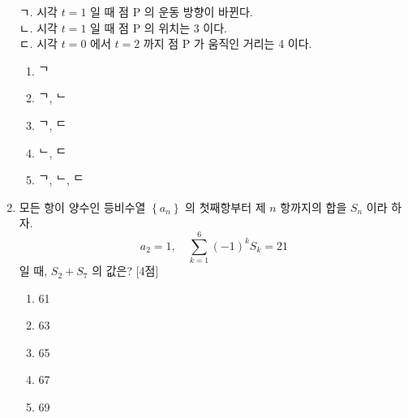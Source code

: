 \documentclass[10.5pt]{article}
\begin{document}
\begin{multicols}{2}
\begin{enumerate}
\begin{minipage}[t]{\linewidth}
\begin{tcolorbox}[colback=white, colframe=black, boxrule=0.5pt, arc=2pt, boxsep=3pt, left=4pt, right=4pt, top=3pt, bottom=3pt]
ㄱ. 시각 $t=1$ 일 때 점 P 의 운동 방향이 바뀐다.\\
ㄴ. 시각 $t=1$ 일 때 점 P 의 위치는 3 이다.\\
ㄷ. 시각 $t=0$ 에서 $t=2$ 까지 점 P 가 움직인 거리는 4 이다.
\end{tcolorbox}
\vspace{0.5em}
\begin{enumerate}[label={\textcircled{\arabic*}}, itemsep=0.2em, topsep=0.2em, leftmargin=*, align=left]
\item ᄀ
\item ᄀ, ᄂ
\item ᄀ, ᄃ
\item ᄂ, ᄃ
\item ᄀ, ᄂ, ᄃ
\end{enumerate}
\par\vspace{12\baselineskip}
\end{minipage}
\item \leavevmode\begin{minipage}[t]{\linewidth}
모든 항이 양수인 등비수열 $\left\{a_{n}\right\}$ 의 첫째항부터 제 $n$ 항까지의 합을 $S_{n}$ 이라 하자.
\[
a_{2}=1, \quad \sum_{k=1}^{6}(-1)^{k} S_{k}=21
\]
일 때, $S_{2}+S_{7}$ 의 값은? [4점]
\vspace{0.5em}
\begin{enumerate}[label={\textcircled{\arabic*}}, itemsep=0.2em, topsep=0.2em, leftmargin=*, align=left]
\item 61
\item 63
\item 65
\item 67
\item 69
\end{enumerate}
\par\vspace{12\baselineskip}
\end{minipage}
\end{enumerate}\end{multicols}
\end{document}
